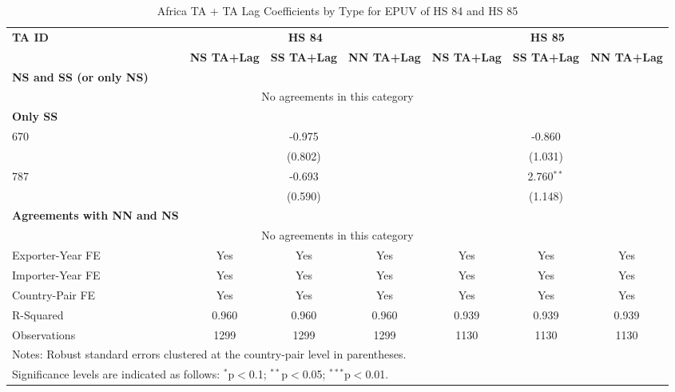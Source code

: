 \begin{table}[htbp]
    \centering
    \caption{Africa TA + TA Lag Coefficients by Type for EPUV of HS 84 and HS 85}
    \label{tab:epuv_africa_pta}
    \begin{adjustbox}{max width=\textwidth}
    \begin{tabular}{lcccccc}
    \hline
    \textbf{TA ID} & \multicolumn{3}{c}{\textbf{HS 84}} & \multicolumn{3}{c}{\textbf{HS 85}} \\
    & \textbf{NS TA+Lag} & \textbf{SS TA+Lag} & \textbf{NN TA+Lag} & \textbf{NS TA+Lag} & \textbf{SS TA+Lag} & \textbf{NN TA+Lag} \\
    \hline
    \textbf{NS and SS (or only NS)} &  &  &  &  &  &  \\
    \hline
    \multicolumn{7}{c}{No agreements in this category} \\
    \hline
    \textbf{Only SS} &  &  &  &  &  &  \\
    \hline
    670 &  & -0.975 &  &  & -0.860 &  \\
     &  & (0.802) &  &  & (1.031) &  \\
    787 &  & -0.693 &  &  & 2.760$^{\ast\ast}$ &  \\
     &  & (0.590) &  &  & (1.148) &  \\
    \hline
    \textbf{Agreements with NN and NS} &  &  &  &  &  &  \\
    \hline
    \multicolumn{7}{c}{No agreements in this category} \\
    \hline
    Exporter-Year FE & Yes & Yes & Yes & Yes & Yes & Yes \\
    Importer-Year FE & Yes & Yes & Yes & Yes & Yes & Yes \\
    Country-Pair FE & Yes & Yes & Yes & Yes & Yes & Yes \\
    R-Squared & 0.960 & 0.960 & 0.960 & 0.939 & 0.939 & 0.939 \\
    Observations & 1299 & 1299 & 1299 & 1130 & 1130 & 1130 \\
    \hline
    \multicolumn{7}{l}{\footnotesize{Notes: Robust standard errors clustered at the country-pair level in parentheses.}} \\
    \multicolumn{7}{l}{\footnotesize{Significance levels are indicated as follows: $^{\ast}$p$<$0.1; $^{\ast\ast}$p$<$0.05; $^{\ast\ast\ast}$p$<$0.01.}} \\
    \end{tabular}
    \end{adjustbox}
\end{table}

